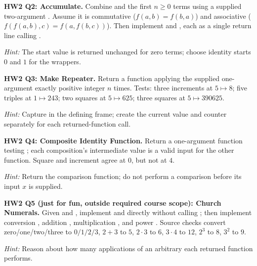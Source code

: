 \begin{prob}
\textbf{HW2 Q2: Accumulate.} Combine  and the first $ n\ge0$ terms using a supplied two-argument . Assume it is commutative ($ f(a,b)=f(b,a)$) and associative ($ f(f(a,b),c)=f(a,f(b,c))$). Then implement  and , each as a single return line calling .\par
\emph{Hint:} The start value is returned unchanged for zero terms; choose identity starts $0$ and $1$ for the wrappers.
\end{prob}
\begin{prob}
\textbf{HW2 Q3: Make Repeater.} Return a function applying the supplied one-argument  exactly positive integer $ n $ times. Tests: three increments at $5\mapsto8$; five triples at $1\mapsto243$; two squares at $5\mapsto625$; three squares at $5\mapsto390625$.\par
\emph{Hint:} Capture  in the defining frame; create the current value and counter separately for each returned-function call.
\end{prob}
\begin{prob}
\textbf{HW2 Q4: Composite Identity Function.} Return a one-argument function testing ; each composition's intermediate value is a valid input for the other function. Square and increment agree at $0$, but not at $4$.\par
\emph{Hint:} Return the comparison function; do not perform a comparison before its input $ x $ is supplied.
\end{prob}
\begin{prob}
\textbf{HW2 Q5 (just for fun, outside required course scope): Church Numerals.} Given  and , implement  and  directly without calling ; then implement conversion , addition , multiplication , and power . Source checks convert zero/one/two/three to $0/1/2/3$, $2+3$ to $5$, $2\cdot3$ to $6$, $3\cdot4$ to $12$, $2^3$ to $8$, $3^2$ to $9$.\par
\emph{Hint:} Reason about how many applications of an arbitrary  each returned function performs.
\end{prob}

